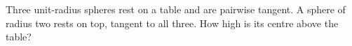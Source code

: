 Three unit-radius spheres rest on a table and are pairwise tangent. A sphere of radius two rests on top, tangent to all three. How high is its centre above the table?
